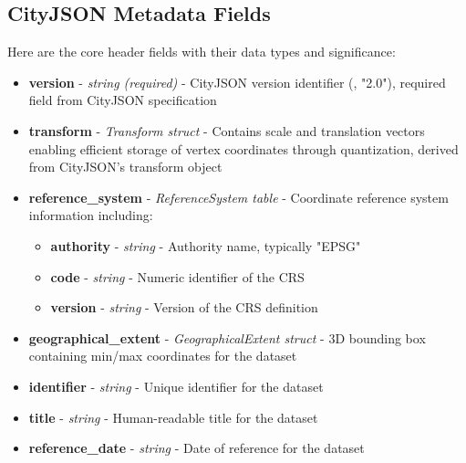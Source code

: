 \subsection{CityJSON Metadata Fields}
\label{methodology:header:cityjson_fields}

Here are the core header fields with their data types and significance:

\begin{itemize}
  \item \textbf{version} - \textit{string (required)} - CityJSON version identifier (\eg, "2.0"), required field from CityJSON specification \citep{cityjson_spec}

  \item \textbf{transform} - \textit{Transform struct} - Contains scale and translation vectors enabling efficient storage of vertex coordinates through quantization, derived from CityJSON's transform object \citep{cityjson_spec}

  \item \textbf{reference\_system} - \textit{ReferenceSystem table} - Coordinate reference system information including:
    \begin{itemize}
      \item \textbf{authority} - \textit{string} - Authority name, typically "EPSG"
      \item \textbf{code} - \textit{string} - Numeric identifier of the CRS
      \item \textbf{version} - \textit{string} - Version of the CRS definition
    \end{itemize}

  \item \textbf{geographical\_extent} - \textit{GeographicalExtent struct} - 3D bounding box containing min/max coordinates for the dataset \citep{cityjson_spec}

  \item \textbf{identifier} - \textit{string} - Unique identifier for the dataset

  \item \textbf{title} - \textit{string} - Human-readable title for the dataset

  \item \textbf{reference\_date} - \textit{string} - Date of reference for the dataset


\end{itemize}
